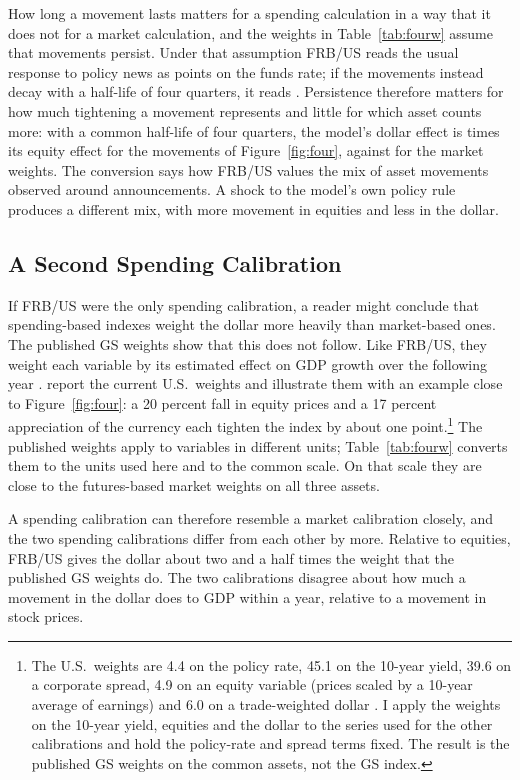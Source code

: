\documentclass[11pt]{article}
\begin{document}
How long a movement lasts matters for a spending calculation in a way that it does not for a market calculation, and the weights in Table~\ref{tab:fourw} assume that movements persist. Under that assumption FRB/US reads the usual response to policy news as  points on the funds rate; if the movements instead decay with a half-life of four quarters, it reads . Persistence therefore matters for how much tightening a movement represents and little for which asset counts more: with a common half-life of four quarters, the model's dollar effect is  times its equity effect for the movements of Figure~\ref{fig:four}, against  for the market weights. The conversion says how FRB/US values the mix of asset movements observed around announcements. A shock to the model's own policy rule produces a different mix, with more movement in equities and less in the dollar.

\subsection{A Second Spending Calibration}\label{sec:gs}
If FRB/US were the only spending calibration, a reader might conclude that spending-based indexes weight the dollar more heavily than market-based ones. The published GS weights show that this does not follow. Like FRB/US, they weight each variable by its estimated effect on GDP growth over the following year \citep{dudley2000,hatzius2018}. \citet{caballero2026b} report the current U.S.\ weights and illustrate them with an example close to Figure~\ref{fig:four}: a 20 percent fall in equity prices and a 17 percent appreciation of the currency each tighten the index by about one point.\footnote{The U.S.\ weights are 4.4 on the policy rate, 45.1 on the 10-year yield, 39.6 on a corporate spread, 4.9 on an equity variable (prices scaled by a 10-year average of earnings) and 6.0 on a trade-weighted dollar \citep{caballero2026b}. I apply the weights on the 10-year yield, equities and the dollar to the series used for the other calibrations and hold the policy-rate and spread terms fixed. The result is the published GS weights on the common assets, not the GS index.} The published weights apply to variables in different units; Table~\ref{tab:fourw} converts them to the units used here and to the common scale. On that scale they are close to the futures-based market weights on all three assets.

A spending calibration can therefore resemble a market calibration closely, and the two spending calibrations differ from each other by more. Relative to equities, FRB/US gives the dollar about two and a half times the weight that the published GS weights do. The two calibrations disagree about how much a movement in the dollar does to GDP within a year, relative to a movement in stock prices.
\end{document}
